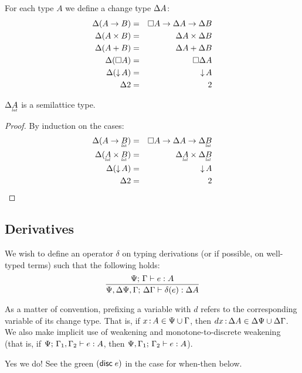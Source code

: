 \documentclass{article}
\begin{document}
For each type $A$ we define a change type $\Delta A$:
\begin{eqnarray*}
  \Delta(A \to B) &=& \square{A} \to \Delta A \to \Delta B\\
  \Delta(A \times B) &=& \Delta A \times \Delta B\\
  \Delta(A + B) &=& \Delta A + \Delta B\\
  \Delta(\square{A}) &=& \square{\Delta A}\\
  \Delta({\downarrow}\,{A}) &=& {\downarrow}\,{A}\\
  \Delta 2 &=& 2
\end{eqnarray*}

\begin{lemma}
  $\GD \lat{A}$ is a semilattice type.
\end{lemma}
\begin{proof}
  By induction on the cases:
  \begin{eqnarray*}
    \GD(A \to \lat{B}) &=& \Disc{A} \to \GD A \to \GD \lat{B}\\
    \GD(\lat{A} \x \lat{B}) &=& \GD \lat{A} \x \GD \lat{B}\\
    \GD(\Down{A}) &=& \Down{A}\\
    \GD 2 &=& 2
  \end{eqnarray*}
\end{proof}


\subsection{Derivatives}

We wish to define an operator $\delta$ on typing derivations (or if possible, on
well-typed terms) such that the following holds:
\[\infer{\J{\GP,\GD\GP,\GG}{\GD\GG}{\delta(e)}{\Delta A}}
        {\J{\GP}{\GG}{e}{A}}
\]

As a matter of convention, prefixing a variable with $d$ refers to the
corresponding variable of its change type. That is, if $x \,{:}\, A \in \Psi \cup
\Gamma$, then $dx \,{:}\, \Delta A \in \Delta\Psi \cup \Delta\Gamma$. We also make implicit use of
weakening and monotone-to-discrete weakening (that is, if
${\Psi};\,{\Gamma_1,\Gamma_2}\vdash {e}:{A}$, then ${\Psi,\Gamma_1};\,{\Gamma_2}\vdash {e}:{A}$).

 {\color{ForestGreen} Yes we do!
  See the green $(\mathsf{disc}\;{e})$ in the case for \textsf{when-then} below.}
\end{document}

